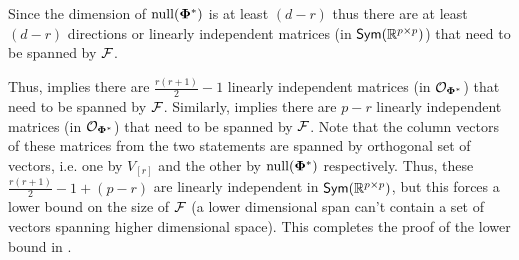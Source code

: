     
    
    
    Since the dimension of $\mathrm{null}({\boldsymbol{\Phi}^*})$ is at least $(d-r)$ thus there are at least $(d-r)$ directions or linearly independent matrices (in $\textsf{Sym}(\mathbb{R}^{p\times p})$) that need to be spanned by ${\mathcal{F}}$.

    Thus,  implies there are $\frac{r(r+1)}{2} -1$ linearly independent matrices (in $\mathcal{O}_{\boldsymbol{\Phi}^*}$) that need to be spanned by ${\mathcal{F}}$. Similarly,  implies there are $p-r$ linearly independent matrices (in $\mathcal{O}_{\boldsymbol{\Phi}^*}$) that need to be spanned by ${\mathcal{F}}$. Note that the column vectors of these matrices from the two statements are spanned by orthogonal set of vectors, i.e. one by $V_{[r]}$ and the other by $\mathrm{null}({\boldsymbol{\Phi}^*})$ respectively. Thus, these $\frac{r(r+1)}{2} -1 + (p-r)$ are linearly independent in $\textsf{Sym}(\mathbb{R}^{p\times p})$, but this forces a lower bound on the size of ${\mathcal{F}}$ (a lower dimensional span can't contain a set of vectors spanning higher dimensional space). This completes the proof of the lower bound in .



